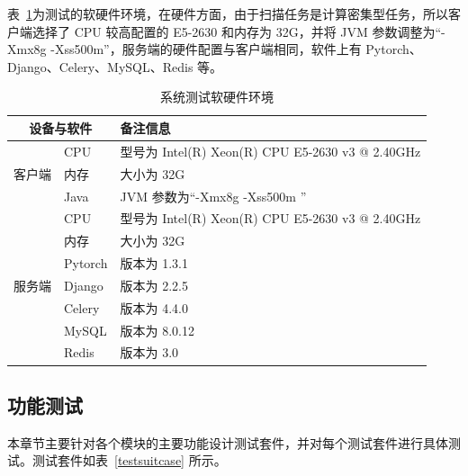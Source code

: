表~\ref{tab:testenv}为测试的软硬件环境，在硬件方面，由于扫描任务是计算密集型任务，所以客户端选择了 CPU 较高配置的 E5-2630 和内存为 32G，并将 JVM 参数调整为“-Xmx8g -Xss500m”，服务端的硬件配置与客户端相同，软件上有 Pytorch、Django、Celery、MySQL、Redis 等。

\begin{table}[!htbp]\footnotesize
    \centering
    \caption{系统测试软硬件环境}
    \begin{tabular}{cll}
        \toprule
        \multicolumn{2}{c}{设备与软件} & 备注信息 \\
        \midrule
        \multirow{3}[2]{*}{客户端} & CPU   & 型号为 Intel(R) Xeon(R) CPU E5-2630 v3 @ 2.40GHz \\
        & 内存    & 大小为 32G \\
        & Java  & JVM 参数为“-Xmx8g -Xss500m ”\\
        \midrule
        \multirow{7}[2]{*}{服务端} 
        & CPU   & 型号为 Intel(R) Xeon(R) CPU E5-2630 v3 @ 2.40GHz \\
        & 内存    & 大小为 32G \\
        & Pytorch & 版本为 1.3.1 \\
        & Django & 版本为 2.2.5 \\
        & Celery & 版本为 4.4.0 \\
        & MySQL & 版本为 8.0.12 \\
        & Redis & 版本为 3.0 \\
        \bottomrule
    \end{tabular}%
    \label{tab:testenv}%
\end{table}%

\subsection{功能测试}
本章节主要针对各个模块的主要功能设计测试套件，并对每个测试套件进行具体测试。测试套件如表~\ref{testsuitcase} 所示。

